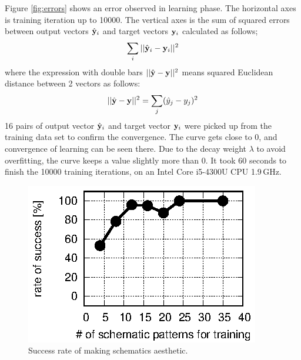\documentclass[twocolumn]{article}
\begin{document}
Figure \ref{fig:errors} shows an error observed in learning phase.
The horizontal axes is training iteration up to 10000.
The vertical axes is the sum of squared errors between
output vectors $\hat{\bf y}_i$ and target vectors ${\bf y}_i$
calculated as follows;
\begin{eqnarray}
\sum_i||\hat{\bf y}_i - {\bf y}_i||^2
\end{eqnarray}
where the expression with double bars $||\hat{\bf y} - {\bf y}||^2$ 
means squared Euclidean distance between 2 vectors as follows:
\begin{eqnarray}
||\hat{\bf y} - {\bf y}||^2 =
\sum_j(\hat{y}_j - y_j)^2
\end{eqnarray}
16 pairs of output vector $\hat{\bf y}_i$ and target vector ${\bf y}_i$
were picked up from the training data set to confirm the convergence.
The curve gets close to 0, and convergence of learning can be seen there.
Due to the decay weight $\lambda$ to avoid overfitting,
the curve keeps a value slightly more than 0.
It took 60 seconds to finish the 10000 training iterations,
on an Intel Core i5-4300U CPU 1.9\,GHz.

\begin{figure}[!tp]
 \begin{center}
  \begin{minipage}{\hsize}
   \includegraphics[width=\hsize]{fig/test_data.eps}
   \caption{Success rate of making schematics aesthetic.}
   \label{fig:test_data}
  \end{minipage}
 \end{center}
\end{figure}
\end{document}

